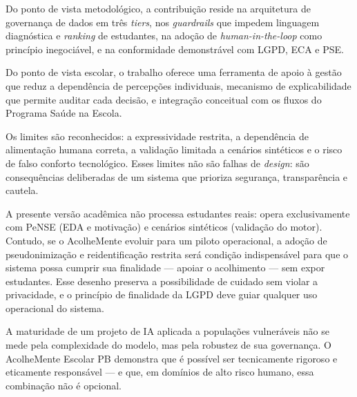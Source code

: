 \documentclass[
    12pt,
    openright,
    oneside,
    a4paper,
    english,
    brazil
]{abntex2}
\begin{document}
Do ponto de vista metodol\'ogico, a contribui\c{c}\~ao reside na arquitetura de governan\c{c}a de dados em tr\^es \textit{tiers}, nos \textit{guardrails} que impedem linguagem diagn\'ostica e \textit{ranking} de estudantes, na ado\c{c}\~ao de \textit{human-in-the-loop} como princ\'ipio inegoci\'avel, e na conformidade demonstr\'avel com LGPD, ECA e PSE.

Do ponto de vista escolar, o trabalho oferece uma ferramenta de apoio \`a gest\~ao que reduz a depend\^encia de percep\c{c}\~oes individuais, mecanismo de explicabilidade que permite auditar cada decis\~ao, e integra\c{c}\~ao conceitual com os fluxos do Programa Sa\'ude na Escola.

Os limites s\~ao reconhecidos: a expressividade restrita, a depend\^encia de alimenta\c{c}\~ao humana correta, a valida\c{c}\~ao limitada a cen\'arios sint\'eticos e o risco de falso conforto tecnol\'ogico. Esses limites n\~ao s\~ao falhas de \textit{design}: s\~ao consequ\^encias deliberadas de um sistema que prioriza seguran\c{c}a, transpar\^encia e cautela.

A presente vers\~ao acad\^emica n\~ao processa estudantes reais: opera exclusivamente com PeNSE (EDA e motiva\c{c}\~ao) e cen\'arios sint\'eticos (valida\c{c}\~ao do motor). Contudo, se o AcolheMente evoluir para um piloto operacional, a ado\c{c}\~ao de pseudonimiza\c{c}\~ao e reidentifica\c{c}\~ao restrita ser\'a condi\c{c}\~ao indispens\'avel para que o sistema possa cumprir sua finalidade --- apoiar o acolhimento --- sem expor estudantes. Esse desenho preserva a possibilidade de cuidado sem violar a privacidade, e o princ\'ipio de finalidade da LGPD \cite{brasil_lgpd_2018} deve guiar qualquer uso operacional do sistema.

A maturidade de um projeto de IA aplicada a popula\c{c}\~oes vulner\'aveis n\~ao se mede pela complexidade do modelo, mas pela robustez de sua governan\c{c}a. O AcolheMente Escolar PB demonstra que \'e poss\'ivel ser tecnicamente rigoroso e eticamente respons\'avel --- e que, em dom\'inios de alto risco humano, essa combina\c{c}\~ao n\~ao \'e opcional.



\end{document}
